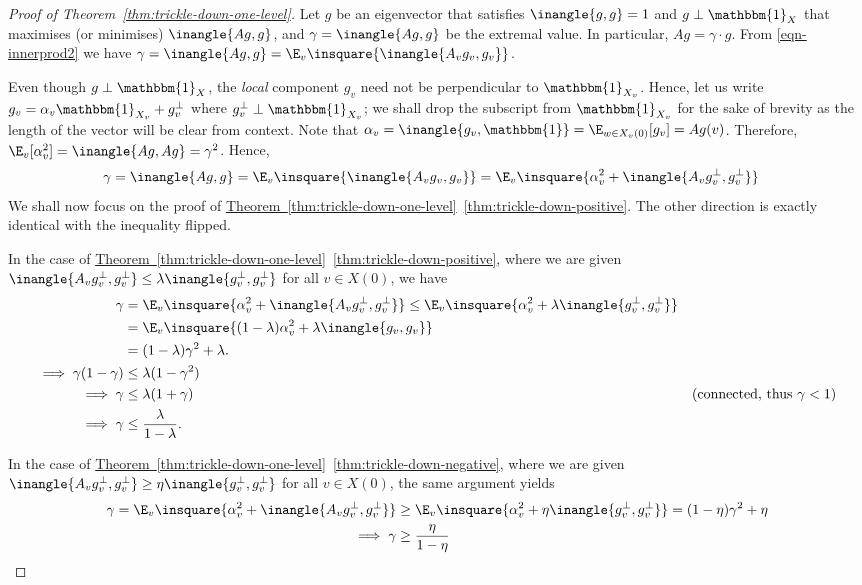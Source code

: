 \documentclass[11pt]{article}
\newcommand{\expref}[2]{\texorpdfstring{\hyperref[#2]{#1~\ref{#2}}}{#1~\ref{#2}}}
\begin{document}
\begin{proof}[Proof of Theorem~\ref{thm:trickle-down-one-level}]
  Let $g$ be an eigenvector that satisfies $\inangle{g,g} = 1$ and
  $g\perp \mathbbm{1}_X$ that maximises (or minimises) $\inangle{Ag,g}$, and $\gamma =
  \inangle{Ag,g}$ be the extremal value. In particular, $Ag =
  \gamma\cdot g$. From \eqref{eqn-innerprod2} we have
    $\gamma = \inangle{Ag,g} = \E_v \insquare{\inangle{A_v g_v,g_v}}$.

    Even though $g \perp \mathbbm{1}_X$, the \emph{local} component $g_v$ need not be perpendicular to $\mathbbm{1}_{X_v}$. Hence,  let us write $g_v = \alpha_v \mathbbm{1}_{X_v} + g_v^{\perp}$ where $g_v^{\perp} \perp \mathbbm{1}_{X_v}$; we shall drop the subscript from $\mathbbm{1}_{X_v}$ for the sake of brevity as the length of the vector will be clear from context. Note that $\alpha_v = \inangle{g_v, \mathbbm{1}} = \E_{w\in X_v(0)} [g_v] = Ag(v)$. Therefore, $\E_v [\alpha_v^2] = \inangle{Ag,Ag} = \gamma^2$. Hence,
  \begin{align}
    \gamma = \inangle{Ag,g} & = \E_v \insquare{\inangle{A_v g_v,g_v}} = \E_v \insquare{\alpha_v^2 + \inangle{A_v g_v^\perp, g_v^{\perp}}}\label{eqn:trickle-LHS}
  \end{align}
  We shall now focus on the proof of \expref{Theorem}{thm:trickle-down-one-level}~\eqref{thm:trickle-down-positive}. The other direction is exactly identical with the inequality flipped.

  In the case of \expref{Theorem}{thm:trickle-down-one-level}~\eqref{thm:trickle-down-positive}, where we are given $\inangle{A_v g_v^\perp, g_v^{\perp}} \leq \lambda \inangle{g_v^\perp, g_v^{\perp}}$ for all $v\in X(0)$, we have
  \begin{align*}
    \gamma &= \E_v \insquare{\alpha_v^2 + \inangle{A_v g_v^\perp, g_v^{\perp}}} \leq \E_v \insquare{\alpha_v^2 + \lambda \inangle{g_v^\perp, g_v^{\perp}}} \\
    & = \E_v \insquare{(1-\lambda) \alpha_v^2 + \lambda \inangle{g_v, g_v}}\\
    &= (1-\lambda) \gamma^2 + \lambda.\\
    \implies \gamma(1-\gamma) & \leq \lambda (1- \gamma^2)\\
    \implies \gamma & \leq \lambda (1+\gamma) &\text{(connected, thus $\gamma < 1$)}\\
    \implies \gamma & \leq \frac{\lambda}{1 - \lambda}.
  \end{align*}

  In the case of \expref{Theorem}{thm:trickle-down-one-level}~\eqref{thm:trickle-down-negative}, where we are given $\inangle{A_v g_v^\perp, g_v^{\perp}} \geq \eta \inangle{g_v^\perp, g_v^{\perp}}$ for all $v\in X(0)$, the same argument yields
  \begin{align*}
    \gamma = \E_v \insquare{\alpha_v^2 + \inangle{A_v g_v^\perp, g_v^{\perp}}}&\geq \E_v \insquare{\alpha_v^2 + \eta \inangle{g_v^\perp, g_v^{\perp}}} = (1 - \eta)\gamma^2 + \eta\\
    \implies \gamma & \geq \frac{\eta}{1 - \eta}\qedhere
  \end{align*}
\end{proof}
\end{document}
